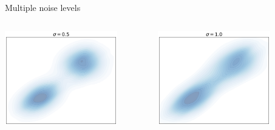 \documentclass[aspectratio=169,xcolor=dvipsnames]{beamer}
\begin{document}
\begin{frame}{Multiple noise levels}
\begin{columns}
\begin{column}{0.32\textwidth}
    \end{column}
  \end{columns}

  \begin{columns}
      \begin{column}{0.32\textwidth}
      \includegraphics[width=0.8\textwidth]{figs/gen/mixture_with_noise_0.5.png}
    \end{column}
      \begin{column}{0.32\textwidth}
      \includegraphics[width=0.8\textwidth]{figs/gen/mixture_with_noise_1.0.png}
    \end{column}
        \begin{column}{0.32\textwidth}

\end{column}
\end{columns}
\end{frame}
\end{document}
